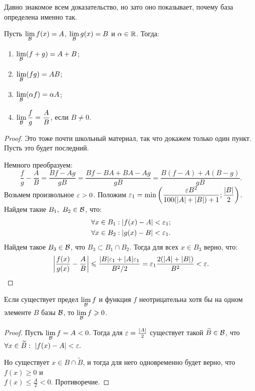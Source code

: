 \documentclass[a4paper, 12pt]{article}
\begin{document}
Давно знакомое всем доказательство, но зато оно показывает, почему база определена именно так.

\begin{Statement}
Пусть $\lim\limits_{\mathcal{B}} f(x) = A$, $\lim\limits_{\mathcal{B}}g(x) = B$ и $\alpha \in \mathbb{R}$. Тогда:
\begin{enumerate}
\item $\lim\limits_{\mathcal{B}}(f + g) = A + B$;
\item $\lim\limits_{\mathcal{B}}(fg) = AB$;
\item $\lim\limits_{\mathcal{B}}(\alpha f) = \alpha A$;
\item $\lim\limits_{\mathcal{B}}\dfrac{f}{g} = \dfrac{A}{B}$, если $B \neq 0$.
\end{enumerate} 
\end{Statement}

\begin{proof}
Это тоже почти школьный материал, так что докажем только один пункт. Пусть это будет последний.

Немного преобразуем:
$$
\frac{f}{g} - \frac{A}{B} = \frac{Bf - Ag}{gB} = \frac{Bf - BA + BA - Ag}{gB} = \frac{B(f - A) + A(B - g)}{gB}.
$$
Возьмем произвольное $\varepsilon > 0$. Положим $\varepsilon_1 = \min\left( \dfrac{\varepsilon B^2}{100(|A| + |B|) + 1}; \dfrac{|B|}{2} \right)$. Найдем такие $B_1,\ B_2 \in \mathcal{B}$, что:
\begin{gather}
\forall x \in B_1: |f(x) - A| < \varepsilon_1;\\
\forall x \in B_2: |g(x) - B| < \varepsilon_1.
\end{gather}
Найдем такое $B_3 \in \mathcal{B}$, что $B_3 \subset B_1 \cap B_2$. Тогда для всех $x \in B_3$ верно, что:
$$
\left| \frac{f(x)}{g(x)} - \frac{A}{B} \right| \leqslant \frac{|B|\varepsilon_1 + |A|\varepsilon_1}{B^2 / 2} = \varepsilon_1 \frac{2(|A| + |B|)}{B^2} < \varepsilon.
$$
\end{proof}

\begin{Statement}
Если существует предел $\lim\limits_{\mathcal{B}}f$ и функция $f$ неотрицательна хотя бы на одном элементе $B$ базы $\mathcal{B}$, то $\lim\limits_{\mathcal{B}}f \geqslant 0$.
\end{Statement}
\begin{proof}
Пусть $\lim\limits_{\mathcal{B}}f = A < 0$. Тогда для $\varepsilon = \frac{|A|}{2}$ существует такой $\widetilde{B} \in \mathcal{B}$, что $\forall x \in \widetilde{B}:\ |f(x) - A| < \varepsilon.$

Но существует $x \in B \cap \widetilde{B}$, и тогда для него одновременно будет верно, что $f(x) \geq 0$ и\\ $f(x) \leq \frac{A}{2} < 0$. Противоречие.
\end{proof}
\end{document}
